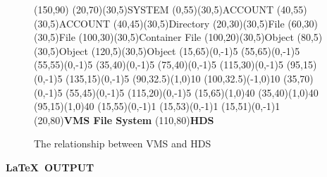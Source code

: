 \documentclass[twoside,11pt]{starlink}
\begin{document}
\begin{terminalv}
\begin{figure}
  \begin{center}
    \begin{picture}(150,90)
      \thicklines
      \put (20,70){\framebox(30,5){SYSTEM}}
      \put (0,55){\framebox(30,5){ACCOUNT}}
      \put (40,55){\framebox(30,5){ACCOUNT}}
      \put (40,45){\framebox(30,5){Directory}}
      \put (20,30){\framebox(30,5){File}}
      \put (60,30){\framebox(30,5){File}}
      \put (100,30){\framebox(30,5){Container File}}
      \put (100,20){\framebox(30,5){Object}}
      \put (80,5){\framebox(30,5){Object}}
      \put (120,5){\framebox(30,5){Object}}
      \put (15,65){\vector(0,-1){5}}
      \put (55,65){\vector(0,-1){5}}
      \put (55,55){\vector(0,-1){5}}
      \put (35,40){\vector(0,-1){5}}
      \put (75,40){\vector(0,-1){5}}
      \put (115,30){\vector(0,-1){5}}
      \put (95,15){\vector(0,-1){5}}
      \put (135,15){\vector(0,-1){5}}
      \put (90,32.5){\vector(1,0){10}}
      \put (100,32.5){\vector(-1,0){10}}
      \put (35,70){\line(0,-1){5}}
      \put (55,45){\line(0,-1){5}}
      \put (115,20){\line(0,-1){5}}
      \put (15,65){\line(1,0){40}}
      \put (35,40){\line(1,0){40}}
      \put (95,15){\line(1,0){40}}
      \put (15,55){\line(0,-1){1}}
      \put (15,53){\line(0,-1){1}}
      \put (15,51){\line(0,-1){1}}
      \put (20,80){\textbf{VMS File System}}
      \put (110,80){\textbf{HDS}}
    \end{picture}
    \caption{The relationship between VMS and HDS}
    \label{the_relationship_between_VMS_and_HDS}
  \end{center}
\end{figure}
\end{terminalv}

\newpage

\begin{center}
  \textbf{\LaTeX\ OUTPUT}
\end{center}
\end{document}

